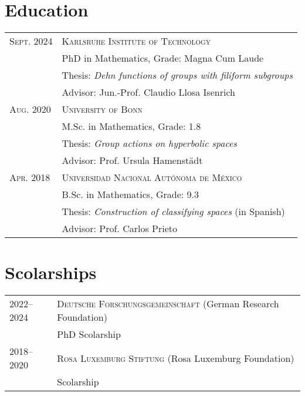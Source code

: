 \documentclass[a4paper,11pt]{article} %
\begin{document}
\section{Education}

\begin{longtable}{>{\raggedleft\arraybackslash}p{4cm}p{10cm}}
\textsc{Sept.} 2024 & \textsc{Karlsruhe Institute of Technology} \vspace{0.3em} \\
& PhD in Mathematics, Grade: Magna Cum Laude \vspace{0.3em}\\
& \quad Thesis: \emph{Dehn functions of groups with filiform subgroups}\\ 
& \quad Advisor: Jun.-Prof. Claudio Llosa Isenrich \vspace{0.5em}\\

\textsc{Aug.} 2020& \textsc{University of Bonn} \vspace{0.3em}\\
&M.Sc. in Mathematics, Grade: 1.8 \vspace{0.3em}\\
& \quad Thesis: \emph{Group actions on hyperbolic spaces}\\ 
& \quad Advisor: Prof. Ursula Hamenstädt \vspace{0.5em}\\

\textsc{Apr.} 2018& \textsc{Universidad Nacional Autónoma de México} \vspace{0.3em}\\ 
& B.Sc. in Mathematics, Grade: 9.3 \vspace{0.3em}\\
& \quad Thesis: \emph{Construction of classifying spaces} (in Spanish)\\ 
& \quad Advisor: Prof. Carlos Prieto\\
\end{longtable}


\section{Scolarships}

\begin{longtable}{>{\raggedleft\arraybackslash}p{4cm}p{10cm}}

\textsc{2022--2024} & \textsc{Deutsche Forschungsgemeinschaft} \small (German Research Foundation)\vspace{0.2em}\\
& PhD Scolarship \vspace{0.2em}\\

\textsc{2018--2020} & \textsc{Rosa Luxemburg Stiftung} \small (Rosa Luxemburg Foundation)\vspace{0.2em}\\
& Scolarship
\end{longtable}
\end{document}
